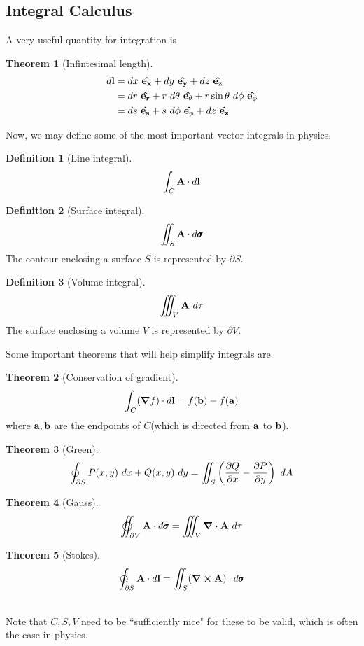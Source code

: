 \documentclass[10pt, a4paper]{extarticle}
\theoremstyle{definition}
\newtheorem{thm}{Theorem}
\newtheorem{defn}{Definition}
\begin{document}
\subsection{Integral Calculus}
A very useful quantity for integration is
\begin{framed}
	\begin{thm}[Infintesimal length]
		\begin{align*}
			d\vb{l} & =dx\ \vu{e_x}+dy\ \vu{e_y}+dz\ \vu{e_z}                                 \\
			        & =dr\ \vu{e_r}+r\ d\theta\ \vu{e_\theta}+r\sin\theta\ d\phi\ \vu{e_\phi} \\
			        & =ds\ \vu{e_s}+s\ d\phi\ \vu{e_\phi}+dz\ \vu{e_z}
		\end{align*}
	\end{thm}
\end{framed}
Now, we may define some of the most important vector integrals in physics.
\begin{framed}
	\begin{defn}[Line integral]
		\[\int_C \vb{A}\cdot d\vb{l}\]
	\end{defn}

	\begin{defn}[Surface integral]
		\[\iint_S \vb{A}\cdot d\pmb{\sigma}\]
		The contour enclosing a surface $S$ is represented by $\partial S$.
	\end{defn}

	\begin{defn}[Volume integral]
		\[\iiint_V \vb{A}\ d\tau\]
		The surface enclosing a volume $V$ is represented by $\partial V$.
	\end{defn}
\end{framed}

Some important theorems that will help simplify integrals are
\begin{framed}
	\begin{thm}[Conservation of gradient]
		\[\int_C(\grad f)\cdot d\vb{l}=f(\vb{b})-f(\vb{a})\]
		where $\vb{a}, \vb{b}$ are the endpoints of $C$(which is directed from $\vb{a}$ to $\vb{b}$).
	\end{thm}
	\begin{thm}[Green]
		\[\oint_{\partial S}P(x,y)\ dx+Q(x,y)\ dy=\iint_S\left(\pdv{Q}{x}-\pdv{P}{y}\right)\ dA\]
	\end{thm}
	\begin{thm}[Gauss]
		\[\varoiint_{\partial V} \vb{A}\cdot d\pmb{\sigma}=\iiint_V \div \vb{A}\ d\tau\]
	\end{thm}

	\begin{thm}[Stokes]
		\[\oint_{\partial S} \vb{A}\cdot d\vb{l}=\iint_S (\curl\vb{A})\cdot d\pmb{\sigma}\]
	\end{thm}
	\hfill\\
	Note that $C,S,V$ need to be ``sufficiently nice" for these to be valid, which is often the case in physics.
\end{framed}
\end{document}
